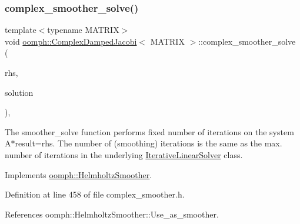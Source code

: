 \subsubsection{\texorpdfstring{complex\+\_\+smoother\+\_\+solve()}{complex\_smoother\_solve()}}
{\footnotesize\ttfamily template$<$typename M\+A\+T\+R\+IX$>$ \\
void \hyperlink{classoomph_1_1ComplexDampedJacobi}{oomph\+::\+Complex\+Damped\+Jacobi}$<$ M\+A\+T\+R\+IX $>$\+::complex\+\_\+smoother\+\_\+solve (\begin{DoxyParamCaption}\item[{const \hyperlink{classoomph_1_1Vector}{Vector}$<$ \hyperlink{classoomph_1_1DoubleVector}{Double\+Vector} $>$ \&}]{rhs,  }\item[{\hyperlink{classoomph_1_1Vector}{Vector}$<$ \hyperlink{classoomph_1_1DoubleVector}{Double\+Vector} $>$ \&}]{solution }\end{DoxyParamCaption})\hspace{0.3cm}{\ttfamily [inline]}, {\ttfamily [virtual]}}



The smoother\+\_\+solve function performs fixed number of iterations on the system A$\ast$result=rhs. The number of (smoothing) iterations is the same as the max. number of iterations in the underlying \hyperlink{classoomph_1_1IterativeLinearSolver}{Iterative\+Linear\+Solver} class. 



Implements \hyperlink{classoomph_1_1HelmholtzSmoother_a8ec748270df3e1199f19ef267d5b8e85}{oomph\+::\+Helmholtz\+Smoother}.



Definition at line 458 of file complex\+\_\+smoother.\+h.



References oomph\+::\+Helmholtz\+Smoother\+::\+Use\+\_\+as\+\_\+smoother.

\mbox{\label{classoomph_1_1ComplexDampedJacobi_a09214dc600fe5d261bdb3795aa943aac}} 
